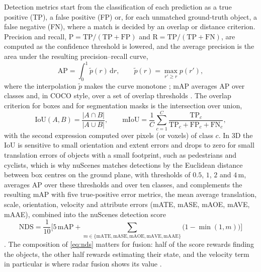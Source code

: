 Detection metrics start from the classification of each prediction as a true positive (TP), a false positive (FP) or, for each unmatched ground-truth object, a false negative (FN), where a match is decided by an overlap or distance criterion. Precision and recall, $\mathrm{P}=\mathrm{TP}/(\mathrm{TP}+\mathrm{FP})$ and $\mathrm{R}=\mathrm{TP}/(\mathrm{TP}+\mathrm{FN})$, are computed as the confidence threshold is lowered, and the average precision is the area under the resulting precision--recall curve,
\begin{equation}
\mathrm{AP}=\int_{0}^{1}\tilde{p}(r)\,\mathrm{d}r,\qquad \tilde{p}(r)=\max_{r'\ge r}p(r'),
\label{eq:ap}
\end{equation}
where the interpolation $\tilde{p}$ makes the curve monotone \cite{everingham2010_voc}; mAP averages AP over classes and, in COCO style, over a set of overlap thresholds \cite{lin2014_coco}. The overlap criterion for boxes and for segmentation masks is the intersection over union,
\begin{equation}
\mathrm{IoU}(A,B)=\frac{|A\cap B|}{|A\cup B|},\qquad
\mathrm{mIoU}=\frac{1}{C}\sum_{c=1}^{C}\frac{\mathrm{TP}_{c}}{\mathrm{TP}_{c}+\mathrm{FP}_{c}+\mathrm{FN}_{c}},
\label{eq:iou}
\end{equation}
with the second expression computed over pixels (or voxels) of class $c$. In 3D the IoU is sensitive to small orientation and extent errors and drops to zero for small translation errors of objects with a small footprint, such as pedestrians and cyclists, which is why nuScenes matches detections by the Euclidean distance between box centres on the ground plane, with thresholds of $0.5$, $1$, $2$ and $4$\,m, averages AP over these thresholds and over ten classes, and complements the resulting mAP with five true-positive error metrics, the mean average translation, scale, orientation, velocity and attribute errors (mATE, mASE, mAOE, mAVE, mAAE), combined into the nuScenes detection score
\begin{equation}
\mathrm{NDS}=\frac{1}{10}\Big[5\,\mathrm{mAP}+\sum_{m\in\{\mathrm{mATE},\mathrm{mASE},\mathrm{mAOE},\mathrm{mAVE},\mathrm{mAAE}\}}\big(1-\min(1,m)\big)\Big]
\label{eq:nds}
\end{equation}
\cite{caesar2020_nuscenes}. The composition of \eqref{eq:nds} matters for fusion: half of the score rewards finding the objects, the other half rewards estimating their state, and the velocity term in particular is where radar fusion shows its value \cite{nabati2021_centerfusion,kim2023_crn}.

